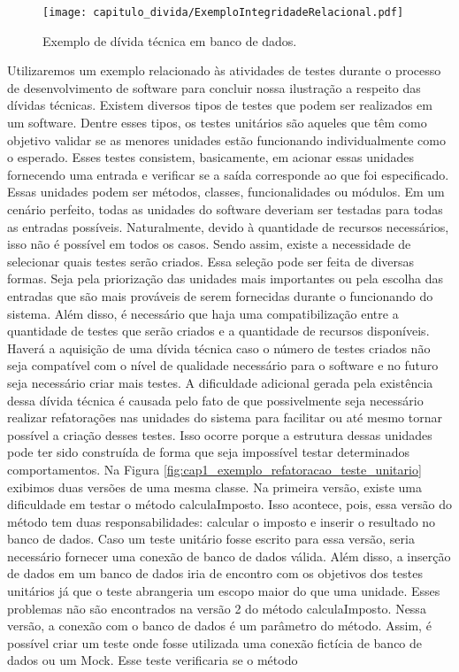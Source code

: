  \begin{figure}[!h]
  \centering
  \texttt{[image: capitulo\_divida/ExemploIntegridadeRelacional.pdf]} 
  \caption{Exemplo de dívida técnica em banco de dados. }
  \label{fig:cap1_exemplo_integridade_referencial} 
\end{figure}
 
 



Utilizaremos um exemplo relacionado às atividades de testes durante o processo de desenvolvimento de software para concluir nossa ilustração a respeito das dívidas técnicas. Existem diversos tipos de testes que podem ser realizados em um software. Dentre esses tipos, os testes unitários são aqueles que têm como objetivo validar se as menores unidades estão funcionando individualmente como o esperado\cite{cheon2002simple,runeson2006survey}. Esses testes consistem, basicamente, em acionar essas unidades fornecendo uma entrada e verificar se a saída corresponde ao que foi especificado.  Essas unidades podem ser métodos, classes, funcionalidades ou módulos. Em um cenário perfeito, todas as unidades do software deveriam ser testadas para todas as entradas possíveis. Naturalmente, devido à quantidade de recursos necessários, isso não é possível em todos os casos. Sendo assim, existe a necessidade de selecionar quais testes serão criados. Essa seleção pode ser feita de diversas formas. Seja pela priorização das unidades mais importantes ou pela escolha das entradas que são mais prováveis de serem fornecidas durante o funcionando do sistema. Além disso, é necessário que haja uma compatibilização entre a quantidade de testes que serão criados e a quantidade de recursos disponíveis. Haverá a aquisição de uma dívida técnica caso o número de testes criados não seja compatível com o nível de qualidade necessário para o software e no futuro seja necessário criar mais testes. A dificuldade adicional gerada pela existência dessa dívida técnica é causada pelo fato de que possivelmente seja necessário realizar refatorações\cite{mcintosh2014impact,morales2016finding} nas unidades do sistema para facilitar ou até mesmo tornar possível a criação desses testes. Isso ocorre porque a estrutura dessas unidades pode ter sido construída de forma que seja impossível testar determinados comportamentos. Na Figura \ref{fig:cap1_exemplo_refatoracao_teste_unitario} exibimos duas versões de uma mesma classe. Na primeira versão, existe uma dificuldade em testar o método calculaImposto. Isso acontece, pois, essa versão do método tem duas responsabilidades: calcular o imposto e inserir o resultado no banco de dados. Caso um teste unitário fosse escrito para essa versão, seria necessário fornecer uma conexão de banco de dados válida. Além disso, a inserção de dados em um banco de dados iria de encontro com os objetivos dos testes unitários já que o teste abrangeria um escopo maior do que uma unidade. Esses problemas não são encontrados na versão 2 do método calculaImposto. Nessa versão, a conexão com o banco de dados é um parâmetro do método. Assim, é possível criar um teste onde fosse utilizada uma conexão fictícia de banco de dados ou um Mock\cite{mackinnon2000endo,kaczanowski2012practical,acharya2014mastering}. Esse teste verificaria se o método 